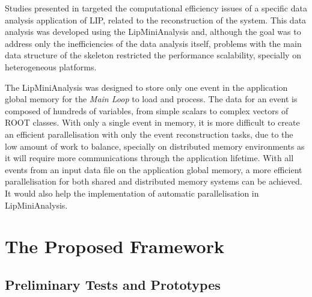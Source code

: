 Studies presented in \cite{Msc:AMP,paperAMP} targeted the computational efficiency issues of a specific data analysis application of LIP, related to the reconstruction of the \ttH system. This data analysis was developed using the LipMiniAnalysis and, although the goal was to address only the inefficiencies of the data analysis itself, problems with the main data structure of the skeleton restricted the performance scalability, specially on heterogeneous platforms.

The LipMiniAnalysis was designed to store only one event in the application global memory for the \textit{Main Loop} to load and process. The data for an event is composed of hundreds of variables, from simple scalars to complex vectors of ROOT classes. With only a single event in memory, it is more difficult to create an efficient parallelisation with only the event reconstruction tasks, due to the low amount of work to balance, specially on distributed memory environments as it will require more communications through the application lifetime. With all events from an input data file on the application global memory, a more efficient parallelisation for both shared and distributed memory systems can be achieved. It would also help the implementation of automatic parallelisation in LipMiniAnalysis.

\section{The Proposed Framework}
\label{new_framework}


\subsection{Preliminary Tests and Prototypes}
\label{work_so_far}

